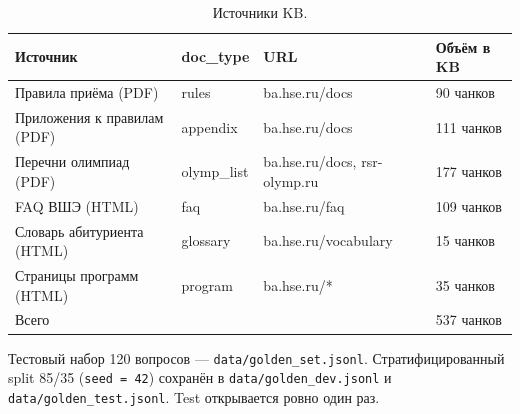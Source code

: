 \documentclass[a4paper,12pt]{extarticle}
\begin{document}
\begin{table}[ht]
\caption{Источники KB.}
\label{tab:kb_sources}
\centering
\begin{tabular}{llll}
\toprule
Источник & doc\_type & URL & Объём в KB \\
\midrule
Правила приёма (PDF) & rules & ba.hse.ru/docs & 90 чанков \\
Приложения к правилам (PDF) & appendix & ba.hse.ru/docs & 111 чанков \\
Перечни олимпиад (PDF) & olymp\_list & ba.hse.ru/docs, rsr-olymp.ru & 177 чанков \\
FAQ ВШЭ (HTML) & faq & ba.hse.ru/faq & 109 чанков \\
Словарь абитуриента (HTML) & glossary & ba.hse.ru/vocabulary & 15 чанков \\
Страницы программ (HTML) & program & ba.hse.ru/* & 35 чанков \\
Всего &  &  & 537 чанков \\
\bottomrule
\end{tabular}
\end{table}

Тестовый набор 120 вопросов --- \texttt{data/golden\_set.jsonl}. Стратифицированный split 85/35 (\texttt{seed = 42}) сохранён в \texttt{data/golden\_dev.jsonl} и \texttt{data/golden\_test.jsonl}. Test открывается ровно один раз.
\end{document}
